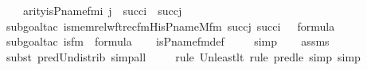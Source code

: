 \begin{isabellebody}
\ \ \ {\isachardoublequoteopen}arity{\isacharparenleft}{\kern0pt}is{\isacharunderscore}{\kern0pt}P{\isacharunderscore}{\kern0pt}name{\isacharunderscore}{\kern0pt}fm{\isacharparenleft}{\kern0pt}i{\isacharcomma}{\kern0pt}\ j{\isacharparenright}{\kern0pt}{\isacharparenright}{\kern0pt}\ {\isasymle}\ succ{\isacharparenleft}{\kern0pt}i{\isacharparenright}{\kern0pt}\ {\isasymunion}\ succ{\isacharparenleft}{\kern0pt}j{\isacharparenright}{\kern0pt}{\isachardoublequoteclose}\ \isanewline
%
\isadelimproof
\ \ %
\endisadelimproof
%
\isatagproof
{}\isamarkupfalse%
{\isacharparenleft}{\kern0pt}subgoal{\isacharunderscore}{\kern0pt}tac\ {\isachardoublequoteopen}is{\isacharunderscore}{\kern0pt}memrel{\isacharunderscore}{\kern0pt}wftrec{\isacharunderscore}{\kern0pt}fm{\isacharparenleft}{\kern0pt}His{\isacharunderscore}{\kern0pt}P{\isacharunderscore}{\kern0pt}name{\isacharunderscore}{\kern0pt}M{\isacharunderscore}{\kern0pt}fm{\isacharcomma}{\kern0pt}\ succ{\isacharparenleft}{\kern0pt}j{\isacharparenright}{\kern0pt}{\isacharcomma}{\kern0pt}\ succ{\isacharparenleft}{\kern0pt}i{\isacharparenright}{\kern0pt}{\isacharcomma}{\kern0pt}\ {}{\isacharparenright}{\kern0pt}\ {\isasymin}\ formula{\isachardoublequoteclose}{\isacharparenright}{\kern0pt}\isanewline
\ \ \isamarkupfalse%
{\isacharparenleft}{\kern0pt}subgoal{\isacharunderscore}{\kern0pt}tac\ {\isachardoublequoteopen}is{\isacharunderscore}{\kern0pt}{}{\isacharunderscore}{\kern0pt}fm{\isacharparenleft}{\kern0pt}{}{\isacharparenright}{\kern0pt}\ {\isasymin}\ formula{\isachardoublequoteclose}{\isacharparenright}{\kern0pt}\isanewline
\ \ \isamarkupfalse%
\ is{\isacharunderscore}{\kern0pt}P{\isacharunderscore}{\kern0pt}name{\isacharunderscore}{\kern0pt}fm{\isacharunderscore}{\kern0pt}def\ \isanewline
\ \ \isamarkupfalse%
\ simp\isanewline
\ \ \isamarkupfalse%
\ assms\isanewline
\ \ \ \ \isamarkupfalse%
{\isacharparenleft}{\kern0pt}subst\ pred{\isacharunderscore}{\kern0pt}Un{\isacharunderscore}{\kern0pt}distrib{\isacharcomma}{\kern0pt}\ simp{\isacharunderscore}{\kern0pt}all{\isacharparenright}{\kern0pt}\isanewline
\ \ \ \ \isamarkupfalse%
{\isacharparenleft}{\kern0pt}rule\ Un{\isacharunderscore}{\kern0pt}least{\isacharunderscore}{\kern0pt}lt{\isacharcomma}{\kern0pt}\ rule\ pred{\isacharunderscore}{\kern0pt}le{\isacharcomma}{\kern0pt}\ simp{\isacharcomma}{\kern0pt}\ simp{\isacharparenright}{\kern0pt}\isanewline
\ \ \ \ \ \isamarkupfalse%

\end{isabellebody}
